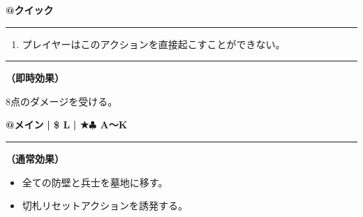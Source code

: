 \documentclass[twocolumn,a5paper,papersize,10pt]{jarticle}
\begin{document}
\begin{tcolorbox}[title={\small\bf【Action】前触れ}{\scriptsize （誘発）}]

{\scriptsize\bf @クイック }

\vspace{1mm} %
\hrule height 0.1mm depth 0mm width 62mm %
\vspace{1mm} %


\vspace{-1zh}%
\begin{enumerate}
\renewcommand{\labelenumi}{※}
\setlength{\leftskip}{-0.3cm}
\setlength{\itemsep}{0pt} %
\setlength{\parskip}{0pt} %

\item プレイヤーはこのアクションを直接起こすことができない。

\vspace{-3mm}%
\end{enumerate}
\vspace{-2mm} %
\vspace{1zh}%
\vspace{1mm} %
\hrule height 0.1mm depth 0mm width 62mm %
\vspace{1mm} %

{\bf（即時効果）}

8点のダメージを受ける。

\vspace{1mm} %
\end{tcolorbox}

\vspace{-1zh}

 
 
\begin{tcolorbox}[title={\small\bf【Action】リセット}{\scriptsize （通常魔法）}]

{\scriptsize\bf @メイン }
  {\scriptsize\bf | \$ L }
  {\scriptsize\bf | ★{\normalsize $\clubsuit$} A〜K}

\vspace{1mm} %
\hrule height 0.1mm depth 0mm width 62mm %
\vspace{1mm} %

{\bf（通常効果）}


\vspace{-1zh}%
\begin{itemize}
\setlength{\leftskip}{-0.3cm}
\setlength{\parskip}{0pt} %

\item 全ての防壁と兵士を墓地に移す。

\item 切札リセットアクションを誘発する。
\vspace{-1zh}%
\end{itemize}

\vspace{1mm} %
\end{tcolorbox}
\end{document}
